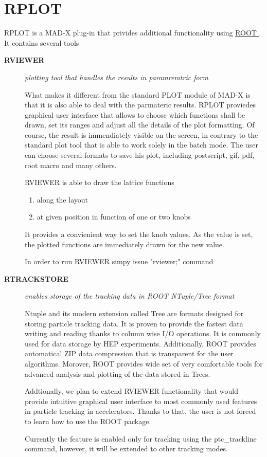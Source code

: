 
\section{RPLOT}
\label{sec:rplot}

RPLOT is a MAD-X plug-in that privides additional functionality using
\href{http://root.cern.ch}{ ROOT }.  It contains several tools   

\begin{description}

\item[\textbf{ RVIEWER }] 
\textit{ plotting tool that handles the results in paramremtric form }

What makes it different      from the standard PLOT module of MAD-X is
that it is also able to      deal with the parmateric results. RPLOT
proviedes graphical user interface      that allows to choose which
functions shall be drawn, set its ranges     and adjust all the details
of the plot formatting. Of course, the result     is immendiately
visible on the screen, in contrary to the standard plot tool     that is
able to work solely in the batch mode. The user can choose several
formats to save his plot, including postscript, gif, pdf, root macro and
many      others.       

RVIEWER is able to draw the lattice functions     
\begin{enumerate}
   \item  along the layout 
   \item  at given position in function of one or two knobs  
\end{enumerate}     

It provides a convienient way to set the knob values. As the value is
set,      the plotted functions are immediately drawn for the new value.            

In order to run RVIEWER simpy issue "rviewer;" command        

\item[\textbf{ RTRACKSTORE }] 
\textit{ enables storage of the tracking data in ROOT NTuple/Tree format }

Ntuple and its modern extension called Tree are formats designed
for storing particle tracking data. It is proven to provide       the
fastest data writing and reading thanks to column wise       I/O
operations. It is commonly used for data storage by HEP
experiments. Additionally, ROOT provides automatical        ZIP data
compression that is transparent for the user algorithms.
Morover, ROOT provides wide set of very comfortable tools       for
advanced analysis and plotting of the data stored in Trees.    

Addtionally, we plan to extend RVIEWER functionality that would provide
intuitive graphical user interface to most commonly used       features
in particle tracking in accelerators. Thanks to that,       the user is
not forced to learn how to use the ROOT package.    

Currently the feature is enabled only for tracking using        the
ptc\_trackline command, however, it will be extended to       other
tracking modes.           
\end{description}

